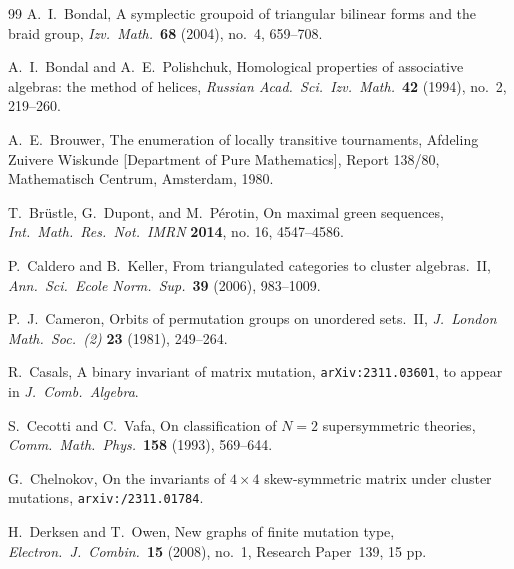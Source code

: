 \documentclass[11pt, letterpaper]{amsart}
\theoremstyle{definition}
\numberwithin{equation}{section}
\begin{document}
\begin{thebibliography}{99}
A.~I.~Bondal, 
A symplectic groupoid of triangular bilinear forms and the braid group, 
\textsl{Izv.\ Math.}\ \textbf{68} (2004), no.~4, 659--708.

A.~I.~Bondal and A.~E.~Polishchuk, 
Homological properties of associative algebras: the method of helices, 
\textsl{Russian Acad.\ Sci.\ Izv.\ Math.}\ \textbf{42} (1994), no.~2, 219--260.


A.~E.~Brouwer, 
The enumeration of locally transitive tournaments, 
Afdeling Zuivere Wiskunde [Department of Pure Mathematics], Report 138/80, 
Mathematisch Centrum, Amsterdam, 1980.

T.~Br\"ustle, G.~Dupont, and M.~P\'erotin, 
On maximal green sequences, 
\textsl{Int.\ Math.\ Res.\ Not.\ IMRN} \textbf{2014}, no. 16, 4547--4586.


P.~Caldero and B.~Keller, 
From triangulated categories to cluster algebras.~II,
\textsl{Ann.\ Sci.\ Ecole Norm.\ Sup.}\ \textbf{39} (2006), 983--1009.


P.~J.~Cameron, 
Orbits of permutation groups on unordered sets.~II,  
\textsl{J.~London Math.\ Soc.\ (2)} \textbf{23} (1981), 249--264. 


R.~Casals,
A binary invariant of matrix mutation, 
\texttt{arXiv:2311.03601}, 
to appear in \textsl{J.~Comb.\ Algebra}. 

S.~Cecotti and C.~Vafa, 
On classification of $N=2$ supersymmetric theories, 
\textsl{Comm.\ Math.\ Phys.}\ \textbf{158} (1993), 569--644.

G.~Chelnokov,
On the invariants of $4 \times 4$ skew-symmetric matrix under cluster mutations,
\texttt{arxiv:/2311.01784}.

H.~Derksen and T.~Owen, 
New graphs of finite mutation type, 
\textsl{Electron.\ J.\ Combin.}\ \textbf{15} (2008), no.~1, Research Paper~139, 15 pp.


\end{thebibliography}
\end{document}
